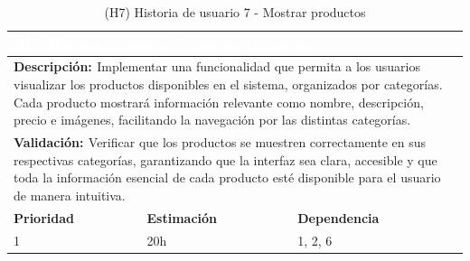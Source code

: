 \begin{table}[H]
  \centering
  \renewcommand{\arraystretch}{1.5}
  \begin{tabular}{|p{}|p{}|p{}|}
    \hline
    \multicolumn{3}{|l|}{\cellcolor{OrangeVIU}\textcolor{white}{\textbf{(H7) Historia de usuario 7: Mostrar productos}}} \\
    \hline
    \multicolumn{3}{|p{\dimexpr0.9\linewidth+2\tabcolsep+2\arrayrulewidth}|}{{\textbf{\textcolor{naranja}{Descripción: }}}Implementar una funcionalidad que permita a los usuarios visualizar los productos disponibles en el sistema, organizados por categorías. Cada producto mostrará información relevante como nombre, descripción, precio e imágenes, facilitando la navegación por las distintas categorías.} \\
    \hline
    \multicolumn{3}{|p{\dimexpr0.9\linewidth+2\tabcolsep+2\arrayrulewidth}|}{{\textbf{\textcolor{naranja}{Validación: }}  Verificar que los productos se muestren correctamente en sus respectivas categorías, garantizando que la interfaz sea clara, accesible y que toda la información esencial de cada producto esté disponible para el usuario de manera intuitiva.}} \\
    \hline
    {\textbf{\textcolor{naranja}{Prioridad }}}  & {\textbf{\textcolor{naranja}{Estimación }}}  & {\textbf{\textcolor{naranja}{Dependencia }}}  \\
    \hline
    1 &  20h &  1, 2, 6 \\
    \hline
  \end{tabular}
  \caption{(H7) Historia de usuario 7 - Mostrar productos}
  \label{table:H7}
\end{table}

